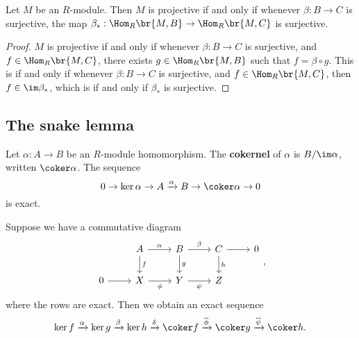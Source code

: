 \begin{proposition}
Let $ M $ be an $ R $-module. Then $ M $ is projective if and only if whenever $ \beta : B \to C $ is surjective, the map $ \beta_* : \Hom_R\br{M, B} \to \Hom_R\br{M, C} $ is surjective.
\end{proposition}

\begin{proof}
$ M $ is projective if and only if whenever $ \beta : B \to C $ is surjective, and $ f \in \Hom_R\br{M, C} $, there exists $ g \in \Hom_R\br{M, B} $ such that $ f = \beta \circ g $. This is if and only if whenever $ \beta : B \to C $ is surjective, and $ f \in \Hom_R\br{M, C} $, then $ f \in \im \beta_* $, which is if and only if $ \beta_* $ is surjective.
\end{proof}

\subsection{The snake lemma}


Let $ \alpha : A \to B $ be an $ R $-module homomorphism. The \textbf{cokernel} of $ \alpha $ is $ B / \im \alpha $, written $ \coker \alpha $. The sequence
$$ 0 \to \ker \alpha \to A \xrightarrow{\alpha} B \to \coker \alpha \to 0 $$
is exact.

\begin{lemma}
Suppose we have a commutative diagram
$$
\begin{tikzcd}
& A \arrow{r}{\alpha} \arrow{d}{f} & B \arrow{r}{\beta} \arrow{d}{g} & C \arrow{r} \arrow{d}{h} & 0 \\
0 \arrow{r} & X \arrow{r}[swap]{\phi} & Y \arrow{r}[swap]{\psi} & Z &
\end{tikzcd},
$$
where the rows are exact. Then we obtain an exact sequence
$$ \ker f \xrightarrow{\alpha} \ker g \xrightarrow{\beta} \ker h \xrightarrow{\delta} \coker f \xrightarrow{\overline{\phi}} \coker g \xrightarrow{\overline{\psi}} \coker h. $$
\end{lemma}

\pagebreak

